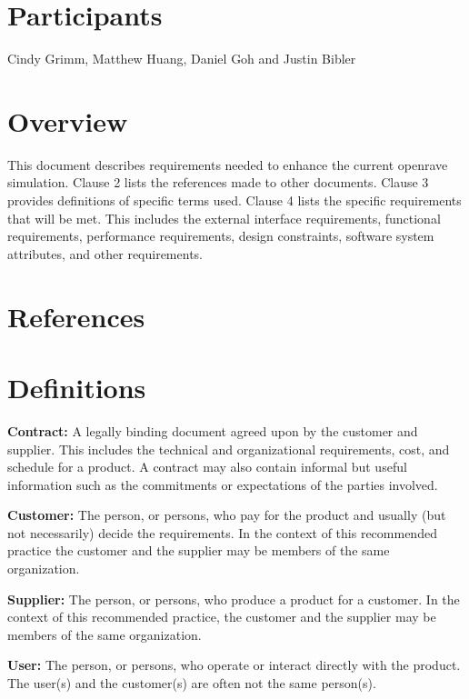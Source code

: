 \documentclass[10pt,journal,compsoc]{IEEEtran}
\begin{document}
\section*{Participants}
\vspace{3mm}
Cindy Grimm, Matthew Huang, Daniel Goh and Justin Bibler \\ 


\newpage

\tableofcontents

\newpage

\section{Overview}
\vspace{3mm}
This document describes requirements needed to enhance the current openrave simulation. 
Clause 2 lists the references made to other documents. 
Clause 3 provides definitions of specific terms used.
Clause 4 lists the specific requirements that will be met.
This includes the external interface requirements, functional requirements, performance requirements, design constraints, software system attributes, and other requirements.

\vfill

\section{References}

\vfill

\section{Definitions}
\begin{flushleft}
\vspace{3mm}
\textbf{Contract:}
A legally binding document agreed upon by the customer and supplier. This includes the technical and organizational requirements, cost, and schedule for a product. A contract may also contain informal but useful information such as the commitments or expectations of the parties involved.

\vspace{3mm}
\textbf{Customer:}
The person, or persons, who pay for the product and usually (but not necessarily) decide the requirements. In the context of this recommended practice the customer and the supplier may be members of the same organization.

\vspace{3mm}
\textbf{Supplier:}
The person, or persons, who produce a product for a customer. In the context of this recommended practice, the customer and the supplier may be members of the same organization.

\vspace{3mm}
\textbf{User:}
The person, or persons, who operate or interact directly with the product. The user(s) and the customer(s) are often not the same person(s).

\end{flushleft}
\vfill
\end{document}
